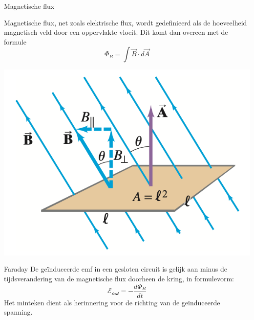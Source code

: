 \newpage

\begin{theo}{Magnetische flux}
    \vspace{-0.65cm}
    \begin{minipage}{0.75\textwidth}
        Magnetische flux, net zoals elektrische flux, wordt gedefinieerd als de hoeveelheid magnetisch veld door een oppervlakte vloeit.
        Dit komt dan overeen met de formule 
        \begin{equation*}
            \Phi_{B} = \int \Vec{B} \cdot d\Vec{A}
        \end{equation*}
    \end{minipage}
    \begin{minipage}{0.21\textwidth}
        \includegraphics[scale=0.35]{Images/Magnetisme/Faraday.png}
    \end{minipage}
    \vspace{-0.15cm}
\end{theo}
    
\begin{lem}[Faraday]{Faraday}
    De geïnduceerde emf in een gesloten circuit is gelijk aan minus de tijdsverandering van de magnetische flux doorheen de kring, in formulevorm:
    \begin{equation*}
        \mathcal{E_{\text{ind}}} = - \dfrac{d\Phi_{B}}{dt}
    \end{equation*}
    Het minteken dient als herinnering voor de richting van de geïnduceerde spanning.
\end{lem}

